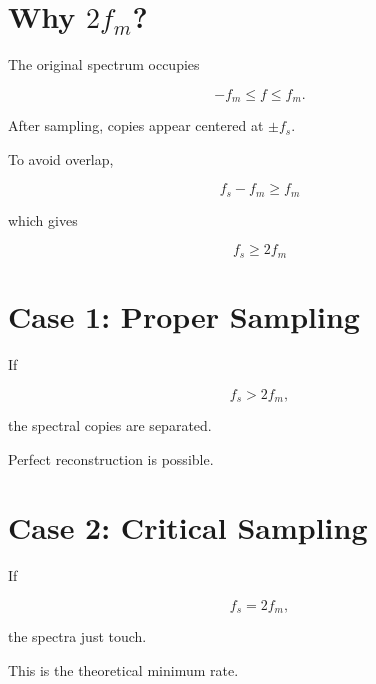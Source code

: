 \section{Why \(2f_m\)?}

The original spectrum occupies

\[
-f_m\le f\le f_m.
\]

After sampling, copies appear centered at \(\pm f_s\).

To avoid overlap,

\[
f_s-f_m\ge f_m
\]

which gives

\[
\boxed{
f_s\ge2f_m
}
\]


\section{Case 1: Proper Sampling}

If

\[
f_s>2f_m,
\]

the spectral copies are separated.

\begin{center}
\end{center}

Perfect reconstruction is possible.


\section{Case 2: Critical Sampling}

If

\[
f_s=2f_m,
\]

the spectra just touch.

This is the theoretical minimum rate.

